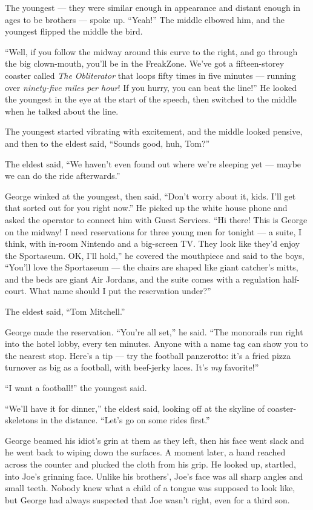 The youngest --- they were similar enough in appearance and distant
enough in ages to be brothers --- spoke up. ``Yeah!'' The middle
elbowed him, and the youngest flipped the middle the bird.

``Well, if you follow the midway around this curve to the right, and go through 
the big clown-mouth, you'll be in the FreakZone. We've got a fifteen-storey 
coaster called \emph{The Obliterator} that loops fifty times in five minutes 
--- running over \emph{ninety-five miles per hour}! If you hurry, you can beat 
the line!''
He looked the youngest in the eye at the start of the speech, then
switched to the middle when he talked about the line.

The youngest started vibrating with excitement, and the middle
looked pensive, and then to the eldest said,
``Sounds good, huh, Tom?''

The eldest said,
``We haven't even found out where we're sleeping yet --- maybe we can do the 
ride afterwards.''

George winked at the youngest, then said,
``Don't worry about it, kids. I'll get that sorted out for you right now.''
He picked up the white house phone and asked the operator to
connect him with Guest Services.
``Hi there! This is George on the midway! I need reservations for three young 
men for tonight --- a suite, I think, with in-room Nintendo and a big-screen 
TV. They look like they'd enjoy the Sportaseum. OK, I'll hold,''
he covered the mouthpiece and said to the boys,
``You'll love the Sportaseum --- the chairs are shaped like giant catcher's 
mitts, and the beds are giant Air Jordans, and the suite comes with a 
regulation half-court. What name should I put the reservation under?''

The eldest said, ``Tom Mitchell.''

George made the reservation. ``You're all set,'' he said.
``The monorails run right into the hotel lobby, every ten minutes. Anyone with 
a name tag can show you to the nearest stop. Here's a tip --- try the football 
panzerotto: it's a fried pizza turnover as big as a football, with beef-jerky 
laces. It's \emph{my} favorite!''

``I want a football!'' the youngest said.

``We'll have it for dinner,'' the eldest said, looking off at the
skyline of coaster-skeletons in the distance.
``Let's go on some rides first.''

George beamed his idiot's grin at them as they left, then his face
went slack and he went back to wiping down the surfaces. A moment
later, a hand reached across the counter and plucked the cloth from
his grip. He looked up, startled, into Joe's grinning face. Unlike
his brothers', Joe's face was all sharp angles and small teeth.
Nobody knew what a child of a tongue was supposed to look like, but
George had always suspected that Joe wasn't right, even for a third
son.

